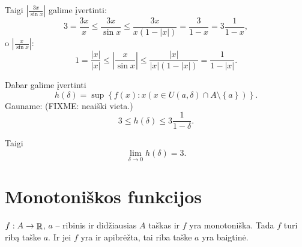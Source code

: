 \begin{exmp}
  Taigi $\left| \frac{3x}{\sin x} \right|$ galime įvertinti:
  \begin{equation*}
    3 = \frac{3x}{x} \leq \frac{3x}{\sin x} \leq \frac{3x}{x(1 - |x|)}
    = \frac{3}{1 - x} = 3 \frac{1}{1 - x},
  \end{equation*}
  o $\left| \frac{x}{\sin x} \right|$:
  \begin{equation*}
    1 = \frac{|x|}{|x|} \leq \left| \frac{x}{\sin x} \right| \leq
    \frac{|x|}{|x|(1 - |x|)} = \frac{1}{1 - |x|}.
  \end{equation*}

  Dabar galime įvertinti
  \begin{equation*}
    h(\delta) = \sup \left\{ f(x) : x 
      (x \in U(a, \delta) \cap A \setminus \left\{ a \right\}) \right\}.
  \end{equation*}
  Gauname: (FIXME: neaiški vieta.)
  \begin{equation*}
    3 \leq h(\delta) \leq 3 \frac{1}{1 - \delta}.
  \end{equation*}

  Taigi
  \begin{equation*}
    \lim _{\delta \to 0} h(\delta) = 3.
  \end{equation*}
\end{exmp}

\section{Monotoniškos funkcijos}

\begin{prop}
  \label{lim_mon}
  $f: A \to \mathop{\mathbb{R}}$, $a$ – ribinis ir didžiausias $A$ taškas ir $f$ yra
  monotoniška. Tada $f$ turi ribą taške $a$. Ir jei $f$ yra ir apibrėžta,
  tai riba taške $a$ yra baigtinė.
\end{prop}

